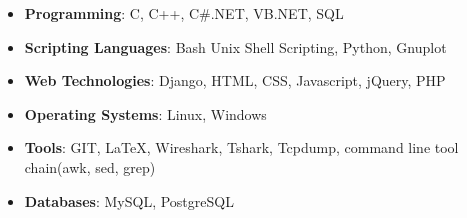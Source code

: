 \begin{itemize}
  \item \textbf{Programming}: C, C++, C\#.NET, VB.NET, SQL \\[-0.6cm]
  \item \textbf{Scripting Languages}: Bash Unix Shell Scripting, Python, Gnuplot \\[-0.6cm]
  \item \textbf{Web Technologies}: Django, HTML, CSS, Javascript, jQuery, PHP \\[-0.6cm]
  \item \textbf{Operating Systems}: Linux, Windows \\[-0.6cm]
  \item \textbf{Tools}: GIT, \LaTeX, Wireshark, Tshark, Tcpdump, command line tool chain(awk, sed, grep) \\[-0.6cm]
  \item \textbf{Databases}: MySQL, PostgreSQL \\[-0.4cm]
\end{itemize}

